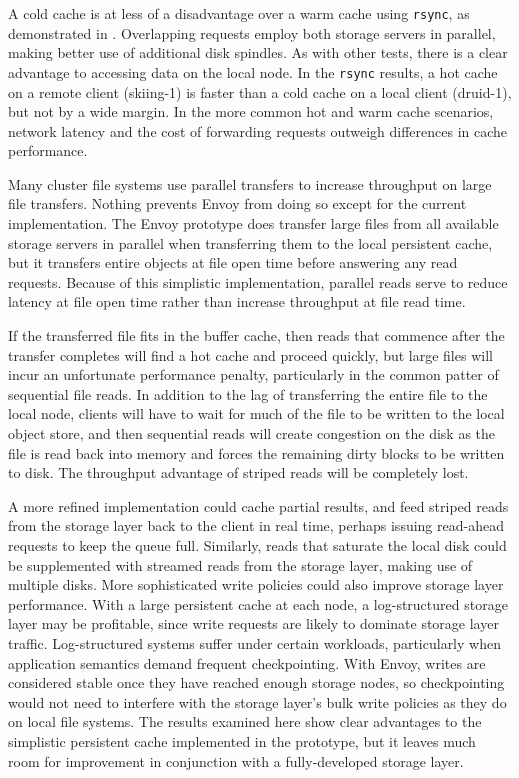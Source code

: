 A cold cache is at less of a disadvantage over a warm cache using \texttt{rsync}, as demonstrated in . Overlapping requests employ both storage servers in parallel, making better use of additional disk spindles. As with other tests, there is a clear advantage to accessing data on the local node. In the \texttt{rsync} results, a hot cache on a remote client (skiing-1) is faster than a cold cache on a local client (druid-1), but not by a wide margin. In the more common hot and warm cache scenarios, network latency and the cost of forwarding requests outweigh differences in cache performance.

Many cluster file systems use parallel transfers to increase throughput on large file transfers. Nothing prevents Envoy from doing so except for the current implementation. The Envoy prototype does transfer large files from all available storage servers in parallel when transferring them to the local persistent cache, but it transfers entire objects at file open time before answering any read requests. Because of this simplistic implementation, parallel reads serve to reduce latency at file open time rather than increase throughput at file read time.

If the transferred file fits in the buffer cache, then reads that commence after the transfer completes will find a hot cache and proceed quickly, but large files will incur an unfortunate performance penalty, particularly in the common patter of sequential file reads. In addition to the lag of transferring the entire file to the local node, clients will have to wait for much of the file to be written to the local object store, and then sequential reads will create congestion on the disk as the file is read back into memory and forces the remaining dirty blocks to be written to disk. The throughput advantage of striped reads will be completely lost.

A more refined implementation could cache partial results, and feed striped reads from the storage layer back to the client in real time, perhaps issuing read-ahead requests to keep the queue full. Similarly, reads that saturate the local disk could be supplemented with streamed reads from the storage layer, making use of multiple disks. More sophisticated write policies could also improve storage layer performance. With a large persistent cache at each node, a log-structured storage layer may be profitable, since write requests are likely to dominate storage layer traffic. Log-structured systems suffer under certain workloads, particularly when application semantics demand frequent checkpointing. With Envoy, writes are considered stable once they have reached enough storage nodes, so checkpointing would not need to interfere with the storage layer's bulk write policies as they do on local file systems. The results examined here show clear advantages to the simplistic persistent cache implemented in the prototype, but it leaves much room for improvement in conjunction with a fully-developed storage layer.

